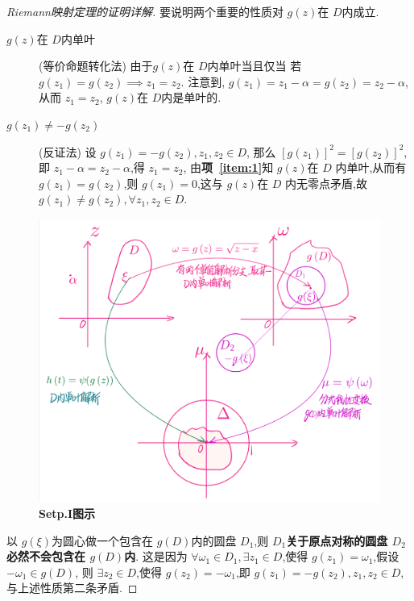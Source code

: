 \begin{proof}[Riemann映射定理的证明详解]
        要说明两个重要的性质对 $g(z)$在 $D$内成立.
        \begin{description}
            \item[\color{magenta!90!black}$g(z)$在 $D$内单叶] (等价命题转化法) 由于$g(z)$在 $D$内单叶当且仅当 若$g(z_1)=g(z_2)\implies z_1=z_2$.
            注意到, $g(z_1)=z_1-\alpha=g(z_2)=z_2-\alpha$,从而 $z_1=z_2$, $g(z)$在 $D$内是单叶的.\label{item:1}
            \item[\color{magenta!90!black}$g(z_1)\neq -g(z_2)$] (反证法)
            设 $g(z_1)=-g(z_2), z_1,z_2\in D$, 那么 $[g(z_1)]^2=[g(z_2)]^2$,即 $z_1-\alpha=z_2-\alpha$,得 $z_1=z_2$, 由\textbf{项~\ref{item:1}}知 $g(z)$在 $D$ 内单叶,从而有 $g(z_1)=g(z_2)$,则 $g(z_1)=0$,这与 $g(z)$在 $D$ 内无零点矛盾,故 $g(z_1)\neq g(z_2), \forall z_1,z_2\in D$.
        \end{description}
\begin{figure}[htb]
    \centering
    \includegraphics[width=.7\linewidth]{figures/IMG_6415.png}
    \caption{\textbf{Setp.I图示}}
    \label{fig:setpi}
\end{figure}
以 $g(\xi)$为圆心做一个包含在 $g(D)$内的圆盘 $D_1$,则 \textbf{\color{magenta!90!black}$D_1$关于原点对称的圆盘 $D_2$必然不会包含在 $g(D)$内}. 这是因为 $\forall\omega_1\in D_1,\exists z_1\in D$,使得 $g(z_1)=\omega_1$,假设 $-\omega_1\in g(D)$, 则 $\exists z_2\in D$,使得 $g(z_2)=-\omega_1$,即 $g(z_1)=-g(z_2), z_1,z_2\in D$, 与上述性质第二条矛盾. 


\end{proof}
